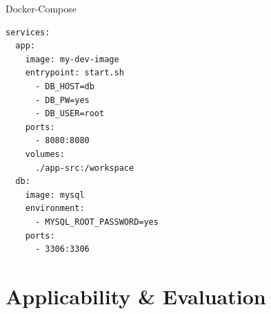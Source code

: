 \documentclass{beamer}
\begin{document}
\begin{frame}[fragile]{Docker-Compose}
  \begin{lstlisting}[language=docker-compose-2,basicstyle=\scriptsize,caption={Exemplary docker-compose.yml file},breaklines=true,label={code::compose_example}]
services:
  app:
    image: my-dev-image
    entrypoint: start.sh
      - DB_HOST=db
      - DB_PW=yes
      - DB_USER=root
    ports:
      - 8080:8080
    volumes:
      ./app-src:/workspace
  db:
    image: mysql
    environment:
      - MYSQL_ROOT_PASSWORD=yes
    ports:
      - 3306:3306
    \end{lstlisting}
\end{frame}




\section{Applicability \& Evaluation}
\end{document}
